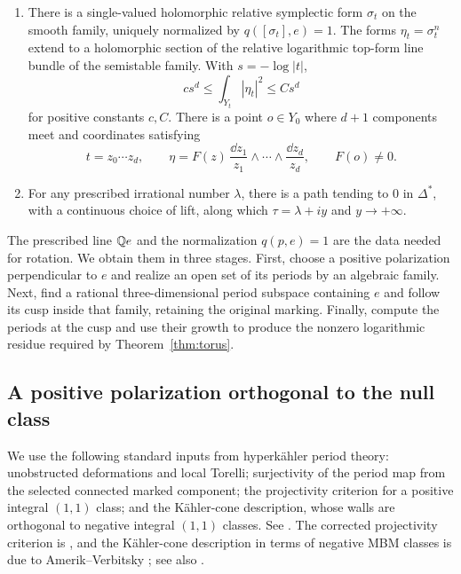 \begin{samepage}
\begin{proposition}
\begin{enumerate}
\begin{equation}
 (M-1)P=\langle e,v\rangle_{\Q},\quad
 (M-1)^2f=-aw^2e\ne0,\quad (M-1)^3=0.
\end{equation}
The same image statement holds if the monodromy convention uses
$M^{-1}$.
\item There is a single-valued holomorphic relative symplectic form
$\sigma_t$ on the smooth family, uniquely normalized by
$q([\sigma_t],e)=1$.  The forms $\eta_t=\sigma_t^n$ extend to a
holomorphic section of the relative logarithmic top-form line
bundle of the semistable family.  With $s=-\log|t|$,
\begin{equation}
 \label{eq:family-volume-growth}
 c s^d\le \int_{Y_t}|\eta_t|^2\le C s^d
\end{equation}
for positive constants $c,C$.  There is a point $o\in Y_0$ where
$d+1$ components meet and coordinates satisfying
\begin{equation}
 \label{eq:family-maximal-residue}
 t=z_0\cdots z_d,\qquad
 \eta=F(z)\,\frac{\dd z_1}{z_1}\wedge\cdots\wedge
                   \frac{\dd z_d}{z_d},\qquad F(o)\ne0.
\end{equation}
\item For any prescribed irrational number $\lambda$, there is a
path tending to $0$ in $\Delta^*$, with a continuous choice of lift,
along which $\tau=\lambda+iy$ and $y\to+\infty$.
\end{enumerate}
\end{proposition}
\end{samepage}

The prescribed line $\mathbb Q e$ and the normalization $q(p,e)=1$ are the
data needed for rotation.  We obtain them in three stages.  First,
choose a positive polarization perpendicular to $e$ and realize an
open set of its periods by an algebraic family.  Next, find a rational
three-dimensional period subspace containing $e$ and follow its cusp
inside that family, retaining the original marking.  Finally, compute
the periods at the cusp and use their growth to produce the nonzero
logarithmic residue required by Theorem~\ref{thm:torus}.

\subsection{A positive polarization orthogonal to the null class}

We use the following standard inputs from hyperkähler period theory:
unobstructed deformations and local Torelli; surjectivity of the
period map from the selected connected marked component; the
projectivity criterion for a positive integral $(1,1)$ class; and
the Kähler-cone description, whose walls are orthogonal to negative
integral $(1,1)$ classes.  See
\cite{Huybrechts,HuybrechtsErratum,Verbitsky,VerbitskyErratum}.
The corrected projectivity criterion is
\cite[Theorem~2]{HuybrechtsErratum}, and the K\"ahler-cone description
in terms of negative MBM classes is due to Amerik--Verbitsky
\cite[Theorems~1.19 and~6.2]{AmerikVerbitsky}; see also
\cite[Section~2.1]{SV}.

